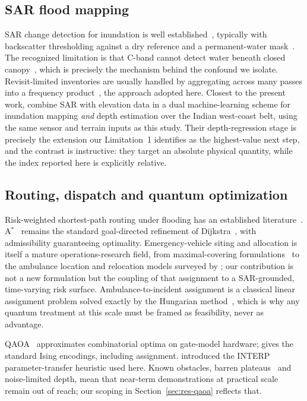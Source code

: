 \documentclass[10pt,twocolumn]{article}
\begin{document}
\subsection{SAR flood mapping}
SAR change detection for inundation is well established~\citep{martinis2009,
twele2016,shen2019}, typically with backscatter thresholding against a dry
reference and a permanent-water mask~\citep{pekel2016}. The recognized limitation
is that C-band cannot detect water beneath closed
canopy~\citep{townsend2002,tsyganskaya2018}, which is precisely the mechanism
behind the confound we isolate. Revisit-limited inventories are usually handled
by aggregating across many passes into a frequency
product~\citep{pekel2016,donchyts2016}, the approach adopted here.
Closest to the present work, \citet{sadhwani2026} combine SAR with elevation data
in a dual machine-learning scheme for inundation mapping \emph{and} depth
estimation over the Indian west-coast belt, using the same sensor and terrain
inputs as this study. Their depth-regression stage is precisely the extension our
Limitation~1 identifies as the highest-value next step, and the contrast is
instructive: they target an absolute physical quantity, while the index reported
here is explicitly relative.

\subsection{Routing, dispatch and quantum optimization}
Risk-weighted shortest-path routing under flooding has an established
literature~\citep{zhang2019,yin2016}. A$^\ast$~\citep{hart1968} remains the
standard goal-directed refinement of Dijkstra~\citep{dijkstra1959}, with
admissibility guaranteeing optimality. Emergency-vehicle siting and allocation is
itself a mature operations-research field, from maximal-covering
formulations~\citep{church1974} to the ambulance location and relocation models
surveyed by \citet{brotcorne2003}; our contribution is not a new formulation but
the coupling of that assignment to a SAR-grounded, time-varying risk surface.
Ambulance-to-incident assignment is a classical linear assignment problem solved
exactly by the Hungarian method~\citep{kuhn1955}, which is why any quantum
treatment at this scale must be framed as feasibility, never as advantage.

QAOA~\citep{farhi2014} approximates combinatorial optima on gate-model hardware;
\citet{lucas2014} gives the standard Ising encodings, including assignment.
\citet{zhou2020} introduced the INTERP parameter-transfer heuristic used here.
Known obstacles, barren plateaus~\citep{mcclean2018} and noise-limited depth,
mean that near-term demonstrations at practical scale remain out of reach; our
scoping in Section~\ref{sec:res-qaoa} reflects that.
\end{document}
